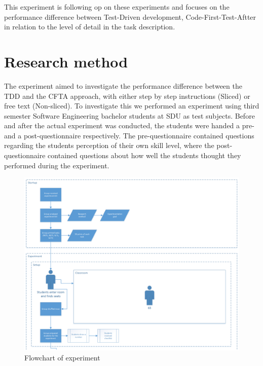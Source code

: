 \documentclass{sig-alternate-05-2015}
\begin{document}
This  experiment is following op on these experiments and focuses on the performance difference between Test-Driven development, Code-First-Test-Aftter in relation to the level of detail in the task description.

\vfill
\eject

\section{Research method}
\label{sec:Research method}
The experiment aimed to investigate the performance difference between the TDD and the CFTA approach, with either step by step instructions (Sliced) or free text (Non-sliced). To investigate this we performed an experiment using third semester Software Engineering bachelor students at SDU as test subjects.
Before and after the actual experiment was conducted, the students were handed a pre- and a post-questionnaire respectively.
The pre-questionnaire contained questions regarding the students perception of their own skill level, where the post-questionnaire contained questions about how well the students thought they performed during the experiment.

\begin{figure}[!ht]
\hspace*{-3.73in}
	\centering
	\includegraphics[width=2.13\linewidth]{flow01}
	\caption{Flowchart of experiment}
	\label{fig:Flowchart}
\end{figure}
\clearpage
\end{document}
